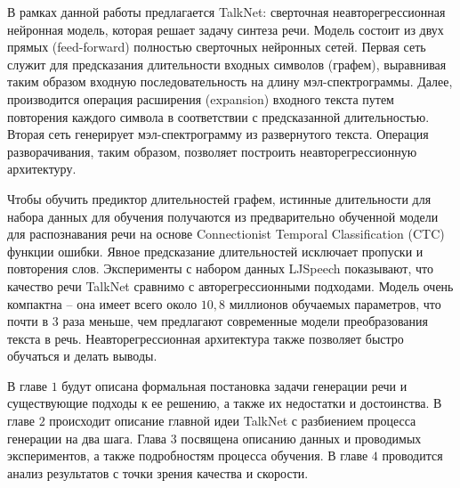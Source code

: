 В рамках данной работы предлагается TalkNet: сверточная неавторегрессионная нейронная модель, которая решает задачу синтеза речи. Модель состоит из двух прямых (feed-forward) полностью сверточных нейронных сетей. Первая сеть служит для предсказания длительности входных символов (графем), выравнивая таким образом входную последовательность на длину мэл-спектрограммы. Далее, производится операция расширения (expansion) входного текста путем повторения каждого символа в соответствии с предсказанной длительностью. Вторая сеть генерирует мэл-спектрограмму из развернутого текста. Операция разворачивания, таким образом, позволяет построить неавторегрессионную архитектуру.

Чтобы обучить предиктор длительностей графем, истинные длительности для набора данных для обучения получаются из предварительно обученной модели для распознавания речи на основе Connectionist Temporal Classification (CTC) функции ошибки. Явное предсказание длительностей исключает пропуски и повторения слов. Эксперименты с набором данных LJSpeech показывают, что качество речи TalkNet сравнимо с авторегрессионными подходами. Модель очень компактна -- она имеет всего около $10,8$ миллионов обучаемых параметров, что почти в 3 раза меньше, чем предлагают современные модели преобразования текста в речь. Неавторегрессионная архитектура также позволяет быстро обучаться и делать выводы.

В главе $1$ будут описана формальная постановка задачи генерации речи и существующие подходы к ее решению, а также их недостатки и достоинства. В главе $2$ происходит описание главной идеи TalkNet с разбиением процесса генерации на два шага. Глава $3$ посвящена описанию данных и проводимых экспериментов, а также подробностям процесса обучения. В главе $4$ проводится анализ результатов с точки зрения качества и скорости.